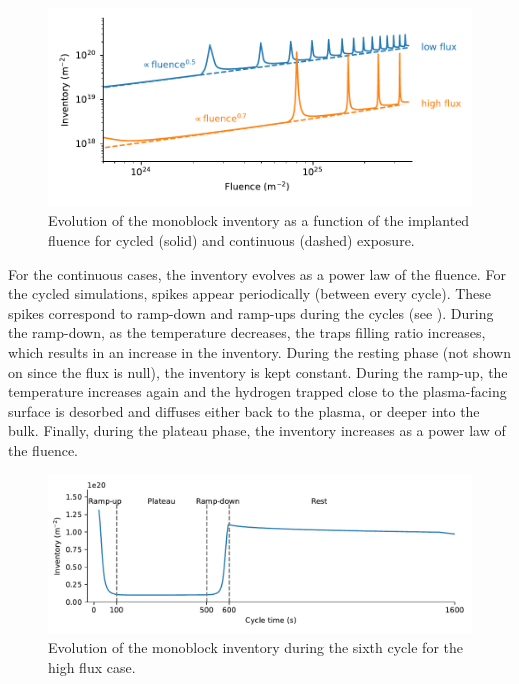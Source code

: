 \begin{figure}
    \centering
    \includegraphics[width=\linewidth]{Figures/Chapter3/monoblocks/comparison_inventory_cycling.pdf}
    \caption{Evolution of the monoblock inventory as a function of the implanted fluence for cycled (solid) and continuous (dashed) exposure.}
\end{figure}

For the continuous cases, the inventory evolves as a power law of the fluence.
For the cycled simulations, spikes appear periodically (between every cycle).
These spikes correspond to ramp-down and ramp-ups during the cycles (see ).
During the ramp-down, as the temperature decreases, the traps filling ratio increases, which results in an increase in the inventory.
During the resting phase (not shown on  since the flux is null), the inventory is kept constant.
During the ramp-up, the temperature increases again and the hydrogen trapped close to the plasma-facing surface is desorbed and diffuses either back to the plasma, or deeper into the bulk.
Finally, during the plateau phase, the inventory increases as a power law of the fluence.

\begin{figure}
    \centering
    \includegraphics[width=\linewidth]{Figures/Chapter3/monoblocks/inventory_one_cycle.pdf}
    \caption{Evolution of the monoblock inventory during the sixth cycle for the high flux case.}
\end{figure}

